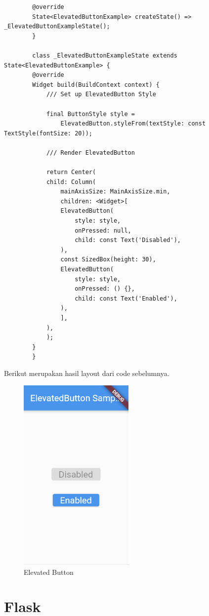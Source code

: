 \begin{enumerate}
\begin{lstlisting}
		@override
		State<ElevatedButtonExample> createState() => _ElevatedButtonExampleState();
		}

		class _ElevatedButtonExampleState extends State<ElevatedButtonExample> {
		@override
		Widget build(BuildContext context) {
			/// Set up ElevatedButton Style

			final ButtonStyle style =
				ElevatedButton.styleFrom(textStyle: const TextStyle(fontSize: 20));

			/// Render ElevatedButton

			return Center(
			child: Column(
				mainAxisSize: MainAxisSize.min,
				children: <Widget>[
				ElevatedButton(
					style: style,
					onPressed: null,
					child: const Text('Disabled'),
				),
				const SizedBox(height: 30),
				ElevatedButton(
					style: style,
					onPressed: () {},
					child: const Text('Enabled'),
				),
				],
			),
			);
		}
		}
	\end{lstlisting}

	Berikut merupakan hasil layout dari code sebelumnya.

	\begin{figure}[H]
		\centering
		\includegraphics[width=0.5\textwidth]{gambar/elevated_button.png}
		\caption{Elevated Button}
	\end{figure}

\end{enumerate}

\section{Flask}


